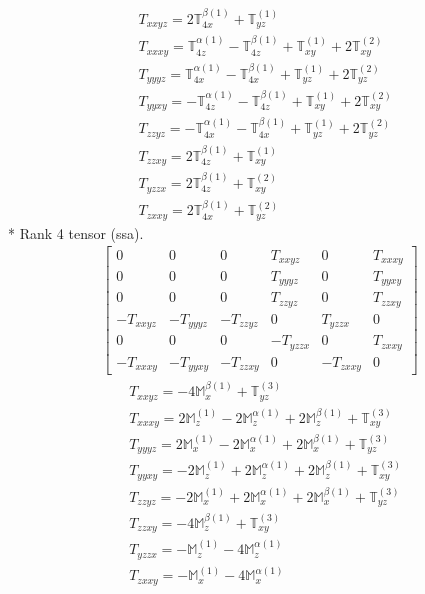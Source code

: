 \documentclass[fleqn,8pt,landscape]{jsarticle}
\begin{document}
\begin{align*}
& T_{xxyz} = 2 \mathbb{T}_{4x}^{\beta(1)} + \mathbb{T}_{yz}^{(1)} \\
& T_{xxxy} = \mathbb{T}_{4z}^{\alpha(1)} - \mathbb{T}_{4z}^{\beta(1)} + \mathbb{T}_{xy}^{(1)} + 2 \mathbb{T}_{xy}^{(2)} \\
& T_{yyyz} = \mathbb{T}_{4x}^{\alpha(1)} - \mathbb{T}_{4x}^{\beta(1)} + \mathbb{T}_{yz}^{(1)} + 2 \mathbb{T}_{yz}^{(2)} \\
& T_{yyxy} = - \mathbb{T}_{4z}^{\alpha(1)} - \mathbb{T}_{4z}^{\beta(1)} + \mathbb{T}_{xy}^{(1)} + 2 \mathbb{T}_{xy}^{(2)} \\
& T_{zzyz} = - \mathbb{T}_{4x}^{\alpha(1)} - \mathbb{T}_{4x}^{\beta(1)} + \mathbb{T}_{yz}^{(1)} + 2 \mathbb{T}_{yz}^{(2)} \\
& T_{zzxy} = 2 \mathbb{T}_{4z}^{\beta(1)} + \mathbb{T}_{xy}^{(1)} \\
& T_{yzzx} = 2 \mathbb{T}_{4z}^{\beta(1)} + \mathbb{T}_{xy}^{(2)} \\
& T_{zxxy} = 2 \mathbb{T}_{4x}^{\beta(1)} + \mathbb{T}_{yz}^{(2)}
\end{align*}
* Rank 4 tensor (ssa).
\begin{align*}
\begin{bmatrix} 0 & 0 & 0 & T_{xxyz} & 0 & T_{xxxy} \\ 0 & 0 & 0 & T_{yyyz} & 0 & T_{yyxy} \\ 0 & 0 & 0 & T_{zzyz} & 0 & T_{zzxy} \\ - T_{xxyz} & - T_{yyyz} & - T_{zzyz} & 0 & T_{yzzx} & 0 \\ 0 & 0 & 0 & - T_{yzzx} & 0 & T_{zxxy} \\ - T_{xxxy} & - T_{yyxy} & - T_{zzxy} & 0 & - T_{zxxy} & 0 \end{bmatrix}
\end{align*}
\begin{align*}
& T_{xxyz} = - 4 \mathbb{M}_{x}^{\beta(1)} + \mathbb{T}_{yz}^{(3)} \\
& T_{xxxy} = 2 \mathbb{M}_{z}^{(1)} - 2 \mathbb{M}_{z}^{\alpha(1)} + 2 \mathbb{M}_{z}^{\beta(1)} + \mathbb{T}_{xy}^{(3)} \\
& T_{yyyz} = 2 \mathbb{M}_{x}^{(1)} - 2 \mathbb{M}_{x}^{\alpha(1)} + 2 \mathbb{M}_{x}^{\beta(1)} + \mathbb{T}_{yz}^{(3)} \\
& T_{yyxy} = - 2 \mathbb{M}_{z}^{(1)} + 2 \mathbb{M}_{z}^{\alpha(1)} + 2 \mathbb{M}_{z}^{\beta(1)} + \mathbb{T}_{xy}^{(3)} \\
& T_{zzyz} = - 2 \mathbb{M}_{x}^{(1)} + 2 \mathbb{M}_{x}^{\alpha(1)} + 2 \mathbb{M}_{x}^{\beta(1)} + \mathbb{T}_{yz}^{(3)} \\
& T_{zzxy} = - 4 \mathbb{M}_{z}^{\beta(1)} + \mathbb{T}_{xy}^{(3)} \\
& T_{yzzx} = - \mathbb{M}_{z}^{(1)} - 4 \mathbb{M}_{z}^{\alpha(1)} \\
& T_{zxxy} = - \mathbb{M}_{x}^{(1)} - 4 \mathbb{M}_{x}^{\alpha(1)}
\end{align*}
\end{document}
